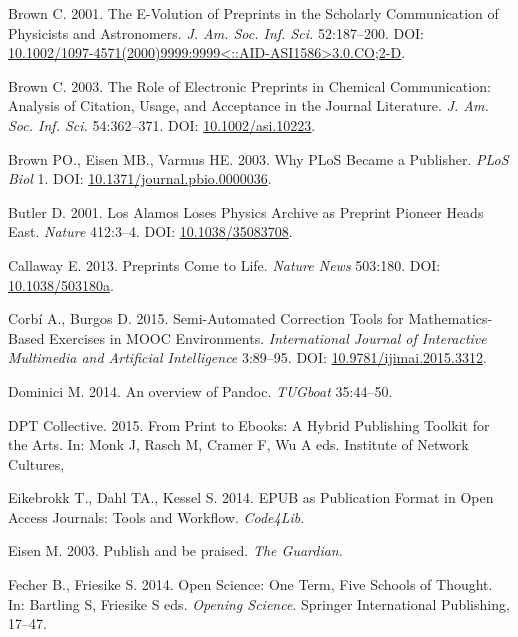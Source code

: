 \documentclass[10pt,fleqn]{wlpeerj}
\begin{document}
\hypertarget{ref-brown_e-volution_2001}{}
Brown
C.
2001.
The
E-Volution
of
Preprints
in
the
Scholarly
Communication
of
Physicists
and
Astronomers.
\emph{J.
Am.
Soc.
Inf.
Sci.}
52:187--200.
DOI:
\href{https://doi.org/10.1002/1097-4571(2000)9999:9999\%3C::AID-ASI1586\%3E3.0.CO;2-D}{10.1002/1097-4571(2000)9999:9999\textless{}::AID-ASI1586\textgreater{}3.0.CO;2-D}.

\hypertarget{ref-brown_role_2003}{}
Brown
C.
2003.
The
Role
of
Electronic
Preprints
in
Chemical
Communication:
Analysis
of
Citation,
Usage,
and
Acceptance
in
the
Journal
Literature.
\emph{J.
Am.
Soc.
Inf.
Sci.}
54:362--371.
DOI:
\href{https://doi.org/10.1002/asi.10223}{10.1002/asi.10223}.

\hypertarget{ref-brown_why_2003}{}
Brown
PO.,
Eisen
MB.,
Varmus
HE.
2003.
Why
PLoS
Became
a
Publisher.
\emph{PLoS
Biol}
1.
DOI:
\href{https://doi.org/10.1371/journal.pbio.0000036}{10.1371/journal.pbio.0000036}.

\hypertarget{ref-butler_alamos_2001}{}
Butler
D.
2001.
Los
Alamos
Loses
Physics
Archive
as
Preprint
Pioneer
Heads
East.
\emph{Nature}
412:3--4.
DOI:
\href{https://doi.org/10.1038/35083708}{10.1038/35083708}.

\hypertarget{ref-callaway_preprints_2013}{}
Callaway
E.
2013.
Preprints
Come
to
Life.
\emph{Nature
News}
503:180.
DOI:
\href{https://doi.org/10.1038/503180a}{10.1038/503180a}.

\hypertarget{ref-garnet_semiautomatic_2015}{}
Corbí
A.,
Burgos
D.
2015.
Semi-Automated
Correction
Tools
for
Mathematics-Based
Exercises
in
MOOC
Environments.
\emph{International
Journal
of
Interactive
Multimedia
and
Artificial
Intelligence}
3:89--95.
DOI:
\href{https://doi.org/10.9781/ijimai.2015.3312}{10.9781/ijimai.2015.3312}.

\hypertarget{ref-dominici_pandoc_2014}{}
Dominici
M.
2014.
An
overview
of
Pandoc.
\emph{TUGboat}
35:44--50.

\hypertarget{ref-dptcollective_toolkit_2015}{}
DPT
Collective.
2015.
From
Print
to
Ebooks:
A
Hybrid
Publishing
Toolkit
for
the
Arts.
In:
Monk
J,
Rasch
M,
Cramer
F, Wu
A
eds.
Institute
of
Network
Cultures,

\hypertarget{ref-eikebrokk_epub_2014}{}
Eikebrokk
T.,
Dahl
TA.,
Kessel
S.
2014.
EPUB
as
Publication
Format
in
Open
Access
Journals:
Tools
and
Workflow.
\emph{Code4Lib}.

\hypertarget{ref-eisen_publish_2003}{}
Eisen
M.
2003.
Publish
and
be
praised.
\emph{The
Guardian}.

\hypertarget{ref-fecher_open_2014}{}
Fecher
B.,
Friesike
S.
2014.
Open
Science:
One
Term,
Five
Schools
of
Thought.
In:
Bartling
S,
Friesike
S
eds.
\emph{Opening
Science}.
Springer
International
Publishing,
17--47.
\end{document}
